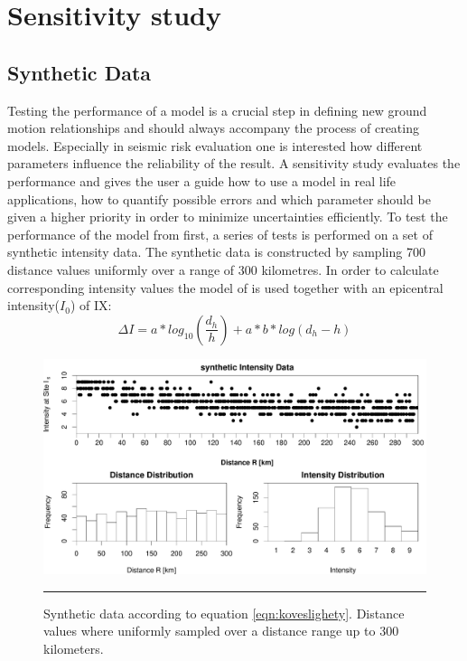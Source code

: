 
\chapter{Sensitivity study} %

\label{Chapter3} %


\section{Synthetic Data}

Testing the performance of a model is a crucial step in defining new ground motion relationships and should always accompany the process of creating models. Especially in seismic risk evaluation one is interested how different parameters influence the reliability of the result. A sensitivity study evaluates the performance and gives the user a guide how to use a model in real life applications, how to quantify possible errors and which parameter should be given a higher priority in order to minimize uncertainties efficiently.
To test the performance of the model from \cite{Rotondi2004} first, a series of tests is performed on a set of synthetic intensity data. The synthetic data is constructed by sampling 700 distance values uniformly over a range of 300 kilometres. In order to calculate corresponding intensity values the model of \cite{Koveslighety1906} is used together with an epicentral intensity($I_0$) of IX:
\vspace{0.1cm}
\begin{equation}
\Delta I = a * log_{10}\left(\dfrac{d_h}{h}\right) + a * b * log(d_h -h)
\label{eqn:koveslighety}
\end{equation}

\begin{figure}[!htpb]
	\centering
		\includegraphics[scale=0.33]{Figures/dataDistro.pdf}
		\rule{35em}{0.5pt}
	\caption[synthetic data]{Synthetic data according to equation \ref{eqn:koveslighety}. Distance values where uniformly sampled over a distance range up to 300 kilometers.}
	\label{fig:dataDistro}
\end{figure}

